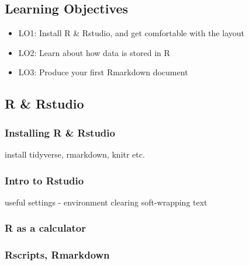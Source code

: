 \documentclass[12pt,]{krantz}
\providecommand{\tightlist}{%
  \setlength{\itemsep}{0pt}\setlength{\parskip}{0pt}}
\begin{document}
\hypertarget{learning-objectives}{%
\subsection*{Learning Objectives}\label{learning-objectives}}

\begin{itemize}
\tightlist
\item
  LO1: Install R \& Rstudio, and get comfortable with the layout\\
\item
  LO2: Learn about how data is stored in R
\item
  LO3: Produce your first Rmarkdown document\\
\end{itemize}

\hypertarget{r-rstudio}{%
\subsection*{R \& Rstudio}\label{r-rstudio}}

\hypertarget{installing-r-rstudio}{%
\subsubsection*{Installing R \& Rstudio}\label{installing-r-rstudio}}

install tidyverse, rmarkdown, knitr etc.

\hypertarget{intro-to-rstudio}{%
\subsubsection*{Intro to Rstudio}\label{intro-to-rstudio}}

useful settings -
environment clearing
soft-wrapping text

\hypertarget{r-as-a-calculator}{%
\subsubsection*{R as a calculator}\label{r-as-a-calculator}}

\hypertarget{rscripts-rmarkdown}{%
\subsubsection*{Rscripts, Rmarkdown}\label{rscripts-rmarkdown}}
\end{document}
